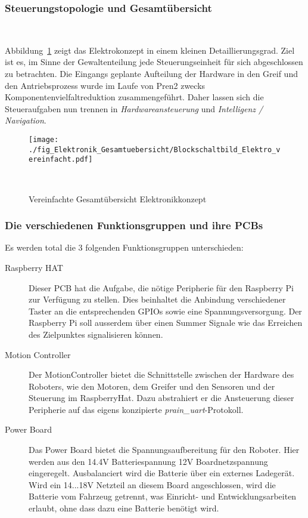 \documentclass[main.tex]{subfiles} %
\begin{document}

\subsubsection{Steuerungstopologie und Gesamtübersicht}~\label{sec:Gesamtuebersicht_Elektro}

Abbildung~\ref{fig:Gesamtuebersicht_vereinfacht} zeigt das Elektrokonzept in
einem kleinen Detaillierungsgrad. Ziel ist es, im Sinne der Gewaltenteilung
jede Steuerungseinheit für sich abgeschlossen zu betrachten. Die Eingangs
geplante Aufteilung der Hardware in den Greif und den Antriebsprozess wurde im
Laufe von Pren2 zwecks Komponentenvielfaltreduktion zusammengeführt. Daher
lassen sich die Steueraufgaben nun trennen in \textit{Hardwareansteuerung} und
\textit{Intelligenz / Navigation}.

\begin{figure}[H]
    \centering
    \texttt{[image: ./fig\_Elektronik\_Gesamtuebersicht/Blockschaltbild\_Elektro\_vereinfacht.pdf]}
    \caption{Vereinfachte Gesamtübersicht Elektronikkonzept}~\label{fig:Gesamtuebersicht_vereinfacht}
\end{figure}

\subsubsection*{Die verschiedenen Funktionsgruppen und ihre PCBs}
Es werden total die 3 folgenden Funktionsgruppen unterschieden:

\begin{description}
    \item[Raspberry HAT] Dieser PCB hat die Aufgabe, die nötige Peripherie für den
        Raspberry Pi zur Verfügung zu stellen. Dies beinhaltet die Anbindung
        verschiedener Taster an die entsprechenden GPIOs sowie eine
        Spannungsversorgung. Der Raspberry Pi soll ausserdem über einen Summer Signale
        wie das Erreichen des Zielpunktes signalisieren können.
    \item[Motion Controller] Der MotionController bietet die Schnittstelle zwischen der
        Hardware des Roboters, wie den Motoren, dem Greifer und den Sensoren und der
        Steuerung im RaspberryHat. Dazu abstrahiert er die Ansteuerung dieser
        Peripherie auf das eigens konzipierte \textit{prain\_uart}-Protokoll.
    \item[Power Board] Das Power Board bietet die Spannungsaufbereitung für den Roboter.
        Hier werden aus den 14.4V Batteriespannung 12V Boardnetzspannung eingeregelt.
        Ausbalanciert wird die Batterie über ein externes Ladegerät. Wird ein 14...18V
        Netzteil an diesem Board angeschlossen, wird die Batterie vom Fahrzeug
        getrennt, was Einricht- und Entwicklungsarbeiten erlaubt, ohne dass dazu eine
        Batterie benötigt wird.
\end{description}
\end{document}

